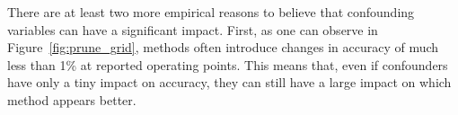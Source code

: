 \vspace{2mm}
There are at least two more empirical reasons to believe that confounding variables can have a significant impact. First, as one can observe in Figure~\ref{fig:prune_grid}, methods often introduce changes in accuracy of much less than 1\% at reported operating points. This means that, even if confounders have only a tiny impact on accuracy, they can still have a large impact on which method appears better. %

